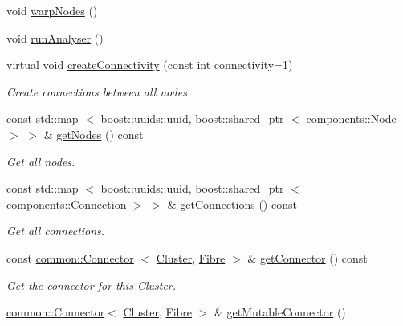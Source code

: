 \begin{DoxyCompactItemize}
\item 
void \hyperlink{classcryomesh_1_1structures_1_1Cluster_aeb806fca24d012f929106cfe0efb0724}{warp\-Nodes} ()
\item 
void \hyperlink{classcryomesh_1_1structures_1_1Cluster_a0ffe5e538e89059208adfbcc86be84fc}{run\-Analyser} ()
\item 
virtual void \hyperlink{classcryomesh_1_1structures_1_1Cluster_a4e3a7e4c28c8f154770ec6568959bc7c}{create\-Connectivity} (const int connectivity=1)
\begin{DoxyCompactList}\small\item\em \-Create connections between all nodes. \end{DoxyCompactList}\item 
const std\-::map\*
$<$ boost\-::uuids\-::uuid, \*
boost\-::shared\-\_\-ptr\*
$<$ \hyperlink{classcryomesh_1_1components_1_1Node}{components\-::\-Node} $>$ $>$ \& \hyperlink{classcryomesh_1_1structures_1_1Cluster_ade4227c5a3f39b17a53c31e4aeb25bfc}{get\-Nodes} () const 
\begin{DoxyCompactList}\small\item\em \-Get all nodes. \end{DoxyCompactList}\item 
const std\-::map\*
$<$ boost\-::uuids\-::uuid, \*
boost\-::shared\-\_\-ptr\*
$<$ \hyperlink{classcryomesh_1_1components_1_1Connection}{components\-::\-Connection} $>$ $>$ \& \hyperlink{classcryomesh_1_1structures_1_1Cluster_aa015d026b0903772780b964fece2cd56}{get\-Connections} () const 
\begin{DoxyCompactList}\small\item\em \-Get all connections. \end{DoxyCompactList}\item 
const \hyperlink{classcryomesh_1_1common_1_1Connector}{common\-::\-Connector}\*
$<$ \hyperlink{classcryomesh_1_1structures_1_1Cluster}{\-Cluster}, \hyperlink{classcryomesh_1_1structures_1_1Fibre}{\-Fibre} $>$ \& \hyperlink{classcryomesh_1_1structures_1_1Cluster_a8822fd5e77bbbaa3900fe6da3acae1a8}{get\-Connector} () const 
\begin{DoxyCompactList}\small\item\em \-Get the connector for this \hyperlink{classcryomesh_1_1structures_1_1Cluster}{\-Cluster}. \end{DoxyCompactList}\item 
\hyperlink{classcryomesh_1_1common_1_1Connector}{common\-::\-Connector}$<$ \hyperlink{classcryomesh_1_1structures_1_1Cluster}{\-Cluster}, \*
\hyperlink{classcryomesh_1_1structures_1_1Fibre}{\-Fibre} $>$ \& \hyperlink{classcryomesh_1_1structures_1_1Cluster_a1490fcafd9e673af89be342def2660cb}{get\-Mutable\-Connector} ()

\end{DoxyCompactItemize}

